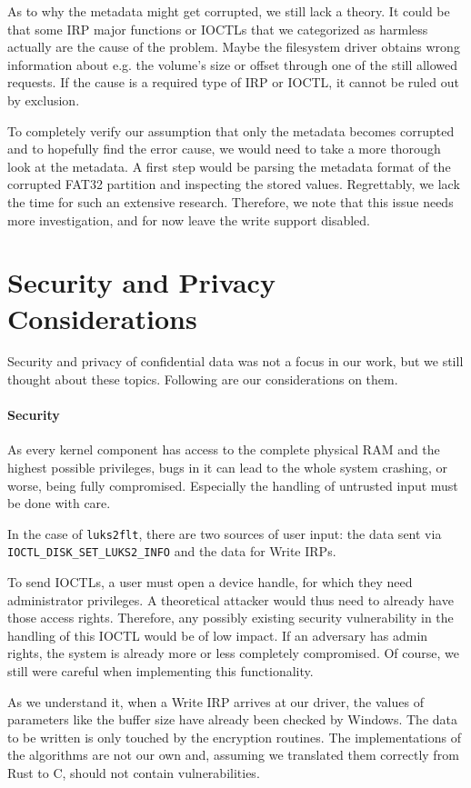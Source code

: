As to why the metadata might get corrupted, we still lack a theory. It could be that some IRP major functions or IOCTLs that we categorized as harmless actually are the cause of the problem. Maybe the filesystem driver obtains wrong information about e.g. the volume's size or offset through one of the still allowed requests. If the cause is a required type of IRP or IOCTL, it cannot be ruled out by exclusion.

To completely verify our assumption that only the metadata becomes corrupted and to hopefully find the error cause, we would need to take a more thorough look at the metadata. A first step would be parsing the metadata format of the corrupted FAT32 partition and inspecting the stored values. Regrettably, we lack the time for such an extensive research. Therefore, we note that this issue needs more investigation, and for now leave the write support disabled.

\section{Security and Privacy Considerations}
\label{chap:ourapproach.security}
Security and privacy of confidential data was not a focus in our work, but we still thought about these topics. Following are our considerations on them.

\paragraph{Security}
As every kernel component has access to the complete physical RAM and the highest possible privileges, bugs in it can lead to the whole system crashing, or worse, being fully compromised. Especially the handling of untrusted input must be done with care.

In the case of \texttt{luks2flt}, there are two sources of user input: the data sent via \texttt{IOCTL\_DISK\_SET\_LUKS2\_INFO} and the data for Write IRPs.

To send IOCTLs, a user must open a device handle, for which they need administrator privileges. A theoretical attacker would thus need to already have those access rights. Therefore, any possibly existing security vulnerability in the handling of this IOCTL would be of low impact. If an adversary has admin rights, the system is already more or less completely compromised. Of course, we still were careful when implementing this functionality.

As we understand it, when a Write IRP arrives at our driver, the values of parameters like the buffer size have already been checked by Windows. The data to be written is only touched by the encryption routines. The implementations of the algorithms are not our own and, assuming we translated them correctly from Rust to C, should not contain vulnerabilities.


